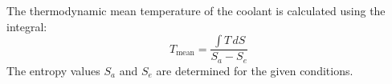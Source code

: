The thermodynamic mean temperature of the coolant is calculated using the integral:  
\[
T_{\text{mean}} = \frac{\int T \, dS}{S_a - S_e}
\]  
The entropy values \( S_a \) and \( S_e \) are determined for the given conditions.